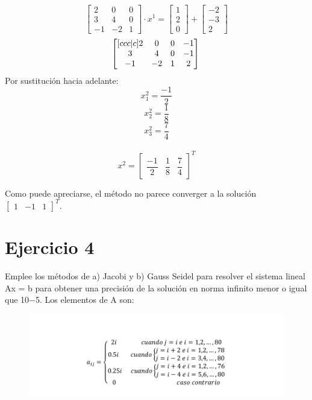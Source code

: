 \documentclass{article}
\begin{document}
\[ 
\begin{bmatrix}
2 & 0 & 0 \\
3 & 4 & 0 \\
-1 & -2 & 1 
\end{bmatrix} \cdot x^{1} = 
\begin{bmatrix}
    1 \\ 2 \\ 0
\end{bmatrix}
+
\begin{bmatrix}
    -2 \\ -3 \\ 2
\end{bmatrix}
\]
\[ 
\begin{bmatrix}[ccc|c]
2 & 0 & 0 & -1 \\
3 & 4 & 0 & -1 \\
-1 & -2 & 1 & 2 
\end{bmatrix}\\
\]
Por sustitución hacia adelante:
\[
x_1^2 = \dfrac{-1}{2}
\]
\[
x_2^2 = \dfrac{1}{8}
\]
\[
x_3^2 = \dfrac{7}{4}
\]\\

\[ x^2 = \begin{bmatrix}
    \dfrac{-1}{2} & \dfrac{1}{8} & \dfrac{7}{4}
\end{bmatrix}^T\]

Como puede apreciarse, el método no parece converger a la solución $\begin{bmatrix}
    1 & -1 & 1
\end{bmatrix}^T$.

\section{Ejercicio 4}
 Emplee los métodos de a) Jacobi y b) Gauss Seidel para resolver el sistema
lineal Ax = b para obtener una precisión de la solución en norma infinito menor o igual
que 10−5. Los elementos de A son:
\begin{figure}[H]
    \centering
    \includegraphics[width=1\linewidth]{Screenshot_20231008_160006.png}
    \label{fig:enter-label}
\end{figure}
\end{document}
